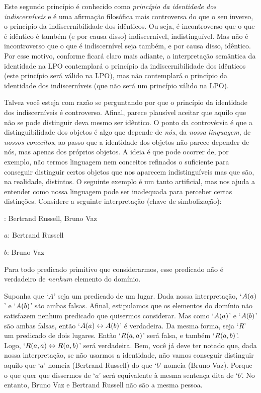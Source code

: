 Este segundo princípio é conhecido como \emph{princípio da identidade dos indiscerníveis} e é uma afirmação filosófica mais controversa do que o seu inverso, o princípio da indiscernibilidade dos idênticos.
Ou seja, é incontroverso que o que é idêntico é também (e por causa disso) indiscernível, indistinguível.
Mas não é incontroverso que o que é indiscernível seja também, e por causa disso, idêntico.
Por esse motivo, conforme ficará claro mais adiante, a interpretação semântica da identidade na LPO contemplará o princípio da indiscernibilidade dos idênticos (este princípio será válido na LPO), mas não contemplará o princípio da identidade dos indiscerníveis (que não será um princípio válido na LPO).

Talvez você esteja com razão se perguntando por que o princípio da identidade dos indiscerníveis é controverso.
Afinal, parece plausível aceitar que aquilo que não se pode distinguir deva mesmo ser idêntico.
O ponto da controvérsia é que a distinguibilidade dos objetos é algo que depende de \emph{nós}, da \emph{nossa linguagem}, de \emph{nossos conceitos}, ao passo que a identidade dos objetos não parece depender de nós, mas apenas dos próprios objetos.
A ideia é que pode ocorrer de, por exemplo, não termos linguagem nem conceitos refinados o suficiente para conseguir distinguir certos objetos que nos aparecem indistinguíveis mas que são, na realidade, distintos.
O seguinte exemplo é um tanto artificial, mas nos ajuda a entender como nossa linguagem pode ser inadequada para perceber certas distinções.
Considere a seguinte interpretação (chave de simbolização):
	\begin{center}
	\begin{ebullet}
		\item[\text{domínio}:] Bertrand Russell, Bruno Vaz
		\item[$a$:] Bertrand Russell
		\item[$b$:] Bruno Vaz
		\item Para todo predicado primitivo que considerarmos, esse predicado não é verdadeiro de \emph{nenhum} elemento do domínio.
	\end{ebullet}
	\end{center}
Suponha que `$A$' seja um predicado de um lugar.
Dada nossa interpretação, `$\mathord{A}(a)$' e `$\mathord{A}(b)$' são ambas falsas.
Afinal, estipulamos que os elementos do domínio não satisfazem nenhum predicado que quisermos considerar.
Mas como `$\mathord{A}(a)$' e `$\mathord{A}(b)$' são ambas falsas, então `$\mathord{A}(a) \leftrightarrow \mathord{A}(b)$' é verdadeira.
Da mesma forma, seja `$R$' um predicado de dois lugares.
Então `$\mathord{R}(a,a)$' será falsa, e também `$\mathord{R}(a,b)$'.
Logo, `$\mathord{R}(a,a) \leftrightarrow \mathord{R}(a,b)$' será verdadeira.
Bem, você já deve ter notado que, dada nossa interpretação, se não usarmos a identidade, não vamos conseguir distinguir aquilo que `$a$' nomeia (Bertrand Russell) do que `$b$' nomeia (Bruno Vaz).
Porque o que quer que dissermos de `$a$' será equivalente à mesma sentença dita de `$b$'.
No entanto, Bruno Vaz e Bertrand Russell não são a mesma pessoa.


